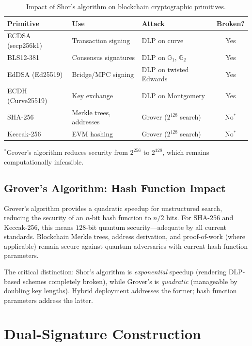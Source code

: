 \documentclass[11pt,a4paper]{article}
\begin{document}
\begin{table}[ht]
\centering
\caption{Impact of Shor's algorithm on blockchain cryptographic primitives.}
\label{tab:shor-impact}
\begin{tabular}{lllc}
\toprule
\textbf{Primitive} & \textbf{Use} & \textbf{Attack} & \textbf{Broken?} \\
\midrule
ECDSA (secp256k1) & Transaction signing & DLP on curve & Yes \\
BLS12-381 & Consensus signatures & DLP on $\mathbb{G}_1$, $\mathbb{G}_2$ & Yes \\
EdDSA (Ed25519) & Bridge/MPC signing & DLP on twisted Edwards & Yes \\
ECDH (Curve25519) & Key exchange & DLP on Montgomery & Yes \\
SHA-256 & Merkle trees, addresses & Grover ($2^{128}$ search) & No$^*$ \\
Keccak-256 & EVM hashing & Grover ($2^{128}$ search) & No$^*$ \\
\bottomrule
\end{tabular}
\vspace{0.3em}
\footnotesize{$^*$Grover's algorithm reduces security from $2^{256}$ to $2^{128}$,
which remains computationally infeasible.}
\end{table}

\subsection{Grover's Algorithm: Hash Function Impact}

Grover's algorithm provides a quadratic speedup for unstructured search, reducing
the security of an $n$-bit hash function to $n/2$ bits. For SHA-256 and Keccak-256,
this means $128$-bit quantum security---adequate by all current standards. Blockchain
Merkle trees, address derivation, and proof-of-work (where applicable) remain secure
against quantum adversaries with current hash function parameters.

The critical distinction: Shor's algorithm is \emph{exponential} speedup (rendering
DLP-based schemes completely broken), while Grover's is \emph{quadratic} (manageable
by doubling key lengths). Hybrid deployment addresses the former; hash function
parameters address the latter.

\section{Dual-Signature Construction}
\label{sec:dual-sig}
\end{document}
